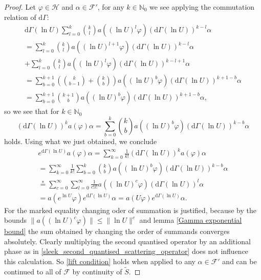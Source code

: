 \documentclass[b5paper,draft,openbib,12pt]{memoir}
\begin{document}
\begin{proof}
Let \(\varphi\in \mathcal{H}\) and \(\alpha\in \mathcal{F}'\), 
for any \(k\in \mathbb{N}_0\) we see applying the commutation 
relation of \(\mathrm{d}\Gamma\):
\begin{multline*}
\mathrm{d}\Gamma(\ln U) \sum_{l=0}^k \binom{k}{l} a \left(\left(\ln U\right)^l \varphi \right) \left(\mathrm{d}\Gamma(\ln U)\right)^{k-l} \alpha\\
=\sum_{l=0}^k \binom{k}{l} a \left(\left(\ln U\right)^{l+1} \varphi \right) \left(\mathrm{d}\Gamma(\ln U)\right)^{k-l}\alpha\\
+\sum_{l=0}^k \binom{k}{l} a \left(\left(\ln U\right)^l \varphi \right) \left(\mathrm{d}\Gamma(\ln U)\right)^{k-l+1}\alpha\\
= \sum_{b=0}^{k+1} \left( \binom{k}{b-1} + \binom{k}{b}\right) a\left( (\ln U)^b \varphi\right) \left( \mathrm{d}\Gamma(\ln U)\right)^{k+1-b}\alpha\\
=\sum_{b=0}^{k+1}  \binom{k+1}{b}  a\left( (\ln U)^b \varphi\right) \left( \mathrm{d}\Gamma(\ln U)\right)^{k+1-b}\alpha,
\end{multline*}
so we see that for \(k\in\mathbb{N}_0\)
\begin{equation}
\left(\mathrm{d}\Gamma(\ln U)\right)^k a (\varphi) \alpha= \sum_{b=0}^{k}  \binom{k}{b}  a\left( (\ln U)^b \varphi\right) \left( \mathrm{d}\Gamma(\ln U)\right)^{k-b}\alpha
\end{equation}
holds. Using what we just obtained, we conclude
\begin{multline*}
e^{\mathrm{d}\Gamma(\ln U)}a(\varphi) \alpha = \sum_{k=0}^\infty \frac{1}{k!} \left(\mathrm{d}\Gamma(\ln U)\right)^k a (\varphi)\alpha\\
=\sum_{k=0}^\infty \frac{1}{k!}  \sum_{b=0}^{k}  \binom{k}{b}  a\left( (\ln U)^b \varphi \right) \left( \mathrm{d}\Gamma(\ln U)\right)^{k-b}\alpha\\
\overset{*}{=}\sum_{c=0}^\infty \sum_{l=0}^\infty \frac{1}{c! l!} a\left( (\ln U)^c \varphi \right) \left( \mathrm{d}\Gamma(\ln U)\right)^{l}\alpha\\
=a\left( e^{\ln U} \varphi \right) e^{\mathrm{d}\Gamma( \ln U)}\alpha
=a\left( U \varphi \right) e^{\mathrm{d}\Gamma( \ln U)}\alpha.
\end{multline*}
For the marked equality changing oder of summation is justified, because by the bounds
 \(\|a((\ln U)^c \varphi)\|\le \|\ln U\|^c\) and  lemma \ref{Gamma exponential bound} the sum obtained by changing the order
 of summands converges absolutely.
Clearly multiplying the second quantised operator by an additional phase as in 
\eqref{sleek_second_quantised_scattering_operator} does not influence this calculation.
So \eqref{lift condition} holds when applied 
to any \(\alpha \in \mathcal{F}'\) and can be continued 
to all of \(\mathcal{F}\) by continuity of \(\tilde{S}\).
\end{proof}
\end{document}
